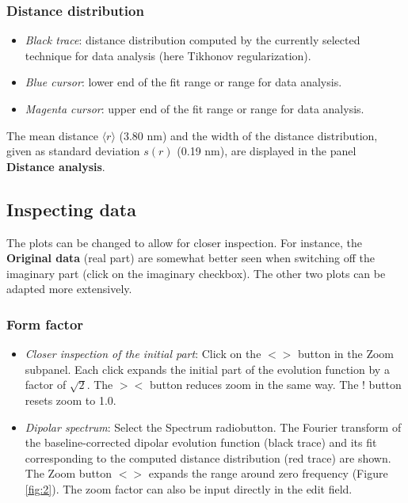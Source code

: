 \documentclass[11pt,a4paper]{article}
\begin{document}
\subsubsection*{Distance distribution}
\begin{itemize}
	\item \emph{Black trace}: distance distribution computed by the currently selected technique for data analysis (here Tikhonov regularization).
	\item \emph{Blue cursor}: lower end of the fit range or range for data analysis.
	\item \emph{Magenta cursor}: upper end of the fit range or range for data analysis.
\end{itemize}

The mean distance $\langle r \rangle$ (3.80 nm) and the width of the distance distribution, given as standard deviation $s(r)$ (0.19 nm), are displayed in the panel {\ttfamily \bf Distance analysis}.

\subsection{Inspecting data}

The plots can be changed to allow for closer inspection. For instance, the {\ttfamily \bf Original data} (real part) are somewhat better seen when switching off the imaginary part (click on the {\ttfamily imaginary} checkbox). The other two plots can be adapted more extensively. 

\subsubsection*{Form factor}
\begin{itemize}
	\item \emph{Closer inspection of the initial part}: Click on the $<>$ button in the {\ttfamily Zoom} subpanel. Each click expands the initial part of the evolution function by a factor of $\sqrt{2}$. The $><$ button reduces zoom in the same way. The {\ttfamily !} button resets zoom to 1.0.
	\item \emph{Dipolar spectrum}: Select the {\ttfamily Spectrum} radiobutton. The Fourier transform of the baseline-corrected dipolar evolution function (black trace) and its fit corresponding to the computed distance distribution (red trace) are shown. The {\ttfamily Zoom} button $<>$ expands the range around zero frequency (Figure \ref{fig:2}). The zoom factor can also be input directly in the edit field.
\end{itemize}
\end{document}
